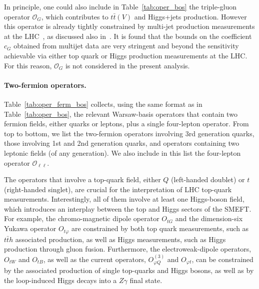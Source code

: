{  In principle, one could also include in
  Table~\ref{tab:oper_bos} the triple-gluon
  operator $\mathcal{O}_{G}$, which contributes to $t\bar{t}(V)$ and Higgs+jets production.
  However this operator is already tightly constrained by
  multi-jet production measurements at the LHC~\cite{Hirschi:2018etq},
  as discussed also in~\cite{Hartland:2019bjb}.
  It is found that the bounds on the coefficient $c_G$ obtained
  from multijet data are very stringent and
  beyond the sensitivity achievable via either top quark or Higgs production measurements
  at the LHC.
  For this reason, $\mathcal{O}_{G}$ is not considered in the present analysis.
}
  
\paragraph{Two-fermion operators.}
%       

%
Table~\ref{tab:oper_ferm_bos} collects, using the same format
as in Table~\ref{tab:oper_bos}, the relevant Warsaw-basis operators
that contain two fermion fields, either quarks or leptons,
plus a single four-lepton operator.
%
From top to bottom, we list the two-fermion operators involving 3rd generation quarks,
those involving 1st and 2nd generation quarks, and
operators containing two leptonic fields (of any generation).
%
We also include in this list the four-lepton operator $\mathcal{O}_{\ell\ell}$.

The operators that involve a top-quark field, either $Q$ (left-handed doublet) or $t$
(right-handed singlet),
are crucial for the interpretation of LHC top-quark measurements.
%
Interestingly, all of them involve at least one Higgs-boson field, which
introduces an interplay between the top and Higgs sectors of the SMEFT.
%
For example, the chromo-magnetic dipole operator $O_{tG}$ and the dimension-six Yukawa
operator $O_{t\varphi}$ are constrained by both top quark measurements, such
as $t\bar t{h}$ associated production, as well as Higgs measurements, such
as Higgs production through gluon fusion.
%
Furthermore, the electroweak-dipole operators, $O_{tW}$ and $O_{tB}$, as well as the
current operators, 
$O_{\varphi Q}^{(3)}$ and $O_{\varphi t}$, can be constrained by the associated production
of single top-quarks and Higgs bosons,
as well as by the loop-induced Higgs decays into a $Z\gamma$ final state.

